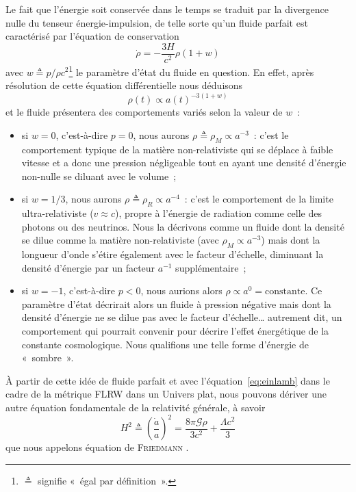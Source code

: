 \documentclass[../main/main.tex]{subfiles}
\begin{document}
Le fait que l'énergie soit conservée dans le temps se traduit par la divergence
nulle du tenseur énergie-impulsion, de telle sorte qu'un fluide parfait est
caractérisé par l'équation de conservation
\begin{equation}\label{eq:cons}
    \dot{\rho} = -\frac{3H}{c^2}\rho(1+w)
\end{equation}
avec $w \triangleq p/\rho c^2$\footnote{$\triangleq$ signifie «~égal par
définition~».} le paramètre d'état du fluide en question. En effet, après
résolution de cette équation différentielle nous déduisons
\begin{equation}\label{eq:rho}
    \rho(t) \propto a(t)^{-3(1+w)}
\end{equation}
et le fluide présentera des comportements variés selon la valeur de $w$~:
\begin{itemize}
    \item si $w=0$, c'est-à-dire $p=0$, nous aurons $\rho \triangleq \rho_M
        \propto a^{-3}$~: c'est le comportement typique de la matière
        non-relativiste qui se déplace à faible vitesse et a donc une pression
        négligeable tout en ayant une densité d'énergie non-nulle se diluant
        avec le volume~;

    \item si $w=1/3$, nous aurons $\rho \triangleq \rho_R \propto a^{-4}$~:
        c'est le comportement de la limite ultra-relativiste ($v \approx c$),
        propre à l'énergie de radiation comme celle des photons ou des
        neutrinos. Nous la décrivons comme un fluide dont la densité se dilue
        comme la matière non-relativiste (avec $\rho_M \propto a^{-3}$) mais
        dont la longueur d'onde s'étire également avec le facteur d'échelle,
        diminuant la densité d'énergie par un facteur $a^{-1}$ supplémentaire~;

    \item si $w=-1$, c'est-à-dire $p < 0$, nous aurions alors $\rho \propto a^0
        = \text{constante}$. Ce paramètre d'état décrirait alors un fluide à
        pression négative mais dont la densité d'énergie ne se dilue pas avec le
        facteur d'échelle… autrement dit, un comportement qui pourrait convenir
        pour décrire l'effet énergétique de la constante cosmologique. Nous
        qualifions une telle forme d'énergie de «~sombre~».
\end{itemize}

À partir de cette idée de fluide parfait et avec l'équation~\ref{eq:einlamb}
dans le cadre de la métrique FLRW dans un Univers plat, nous pouvons dériver une
autre équation fondamentale de la relativité générale, à savoir
\begin{equation}\label{eq:fried}
    H^2 \triangleq \left( \frac{\dot{a}}{a} \right)^2 =
    \frac{8\pi\mathcal{G}\rho}{3c^2} + \frac{\Lambda c^2}{3}
\end{equation}
que nous appelons équation de \textsc{Friedmann} \citep{friedmann1922}.
\end{document}
